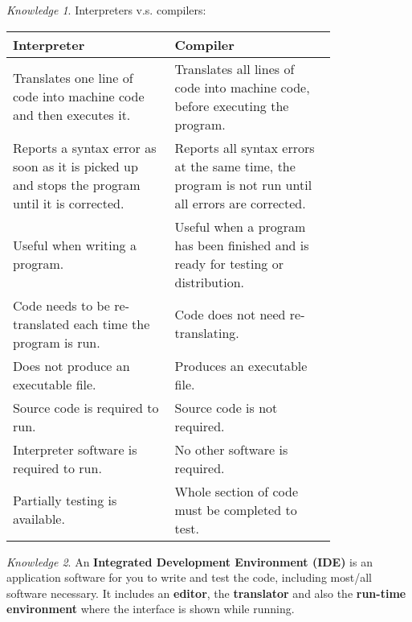 \documentclass[8pt]{article}
\theoremstyle{remark}
\newtheorem{knowledge}{Knowledge}[subsection]
\begin{document}
            \begin{knowledge}
                Interpreters v.s. compilers:
                \begin{center}
                    \begin{tabular}{p{0.4\linewidth}|p{0.4\linewidth}}
                        Interpreter & Compiler\\\hline\hline
                        Translates one line of code into machine code and then executes it. & Translates all lines of code into machine code, before executing the program. \\\hline
                        Reports a syntax error as soon as it is picked up and stops the program until it is corrected. & Reports all syntax errors at the same time, the program is not run until all errors are corrected. \\\hline
                        Useful when writing a program. & Useful when a program has been finished and is ready for testing or distribution. \\\hline
                        Code needs to be re-translated each time the program is run. & Code does not need re-translating.\\\hline
                        Does not produce an executable file. & Produces an executable file.\\\hline
                        Source code is required to run. & Source code is not required.\\\hline
                        Interpreter software is required to run. & No other software is required.\\\hline
                        Partially testing is available. & Whole section of code must be completed to test.
                    \end{tabular}
                \end{center}
            \end{knowledge}

            \begin{knowledge}
                An \textbf{Integrated Development Environment (IDE)} is an application software for you to write and test the code, including most/all software necessary. It includes an \textbf{editor}, the \textbf{translator} and also the \textbf{run-time environment} where the interface is shown while running.
            \end{knowledge}
\end{document}
